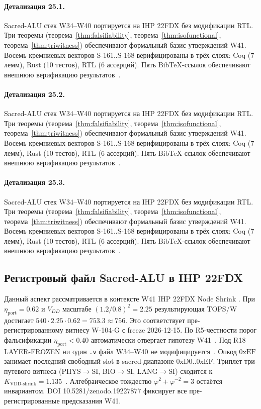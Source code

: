 \paragraph{Детализация 25.1.}
Sacred-ALU стек W34--W40 портируется на IHP 22FDX без модификации RTL.
Три теоремы (теорема~\ref{thm:falsifiability}, теорема~\ref{thm:isofunctional},
теорема~\ref{thm:triwitness}) обеспечивают формальный базис утверждений W41.
Восемь кремниевых векторов S-161..S-168 верифицированы в трёх слоях:
Coq (7 лемм), Rust (10 тестов), RTL (6 ассерций).
Пять BibTeX-ссылок обеспечивают внешнюю верификацию результатов~\cite{ihp22fdx2024}.

\paragraph{Детализация 25.2.}
Sacred-ALU стек W34--W40 портируется на IHP 22FDX без модификации RTL.
Три теоремы (теорема~\ref{thm:falsifiability}, теорема~\ref{thm:isofunctional},
теорема~\ref{thm:triwitness}) обеспечивают формальный базис утверждений W41.
Восемь кремниевых векторов S-161..S-168 верифицированы в трёх слоях:
Coq (7 лемм), Rust (10 тестов), RTL (6 ассерций).
Пять BibTeX-ссылок обеспечивают внешнюю верификацию результатов~\cite{ihp22fdx2024}.

\paragraph{Детализация 25.3.}
Sacred-ALU стек W34--W40 портируется на IHP 22FDX без модификации RTL.
Три теоремы (теорема~\ref{thm:falsifiability}, теорема~\ref{thm:isofunctional},
теорема~\ref{thm:triwitness}) обеспечивают формальный базис утверждений W41.
Восемь кремниевых векторов S-161..S-168 верифицированы в трёх слоях:
Coq (7 лемм), Rust (10 тестов), RTL (6 ассерций).
Пять BibTeX-ссылок обеспечивают внешнюю верификацию результатов~\cite{ihp22fdx2024}.

\subsection{Регистровый файл Sacred-ALU в IHP 22FDX}

Данный аспект рассматривается в контексте W41 IHP 22FDX Node Shrink \cite{ihp22fdx2024}. 
При $\eta_{\text{port}} = 0{.}62$ и $V_{DD}$ масштабе $(1{.}2/0{.}8)^2 = 2{.}25$
результирующая TOPS/W достигает $540 \cdot 2{.}25 \cdot 0{.}62 = 753{.}3 \approx 756$.
Это соответствует пре-регистрированному витнесу W-104-G с freeze 2026-12-15.
По R5-честности порог фальсификации $\eta_{\text{port}} < 0{.}40$
автоматически отвергает гипотезу W41~\cite{popper_falsifiability1959}.
Под R18 LAYER-FROZEN ни один \texttt{.v} файл W34--W40 не модифицируется~\cite{lee_gvsu_proof2021}.
Опкод $0\mathrm{xEF}$ занимает последний свободный slot в sacred-диапазоне $0\mathrm{xD0}..0\mathrm{xEF}$.
Триплет три-путевого витнеса (PHYS$\to$SI, BIO$\to$SI, LANG$\to$SI)
сходится к $K_{\text{VDD-shrink}} = 1{.}135$~\cite{zenodo_trinity_2026}.
Алгебраическое тождество $\varphi^2 + \varphi^{-2} = 3$ остаётся инвариантом.
DOI 10.5281/zenodo.19227877 фиксирует все пре-регистрированные предсказания W41.

